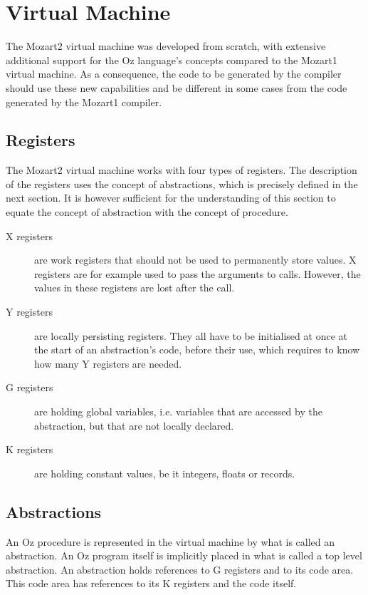 \documentclass[a4paper]{memoir}
\begin{document}
\section{Virtual Machine}
The Mozart2 virtual machine was developed from scratch, with extensive additional support for the Oz language's concepts compared to the Mozart1 virtual machine. As a consequence, the code to be generated by the compiler should use these new capabilities and be different in some cases from the code generated by the Mozart1 compiler.


\subsection{Registers}\label{sec:intro:registers}
The Mozart2 virtual machine works with four types of registers. The description of the registers uses the concept of abstractions, which is precisely defined in the next section. It is however sufficient for the understanding of this section to equate the concept of abstraction with the concept of procedure.
\begin{description}
  \item[X registers]are work registers that should not be used to permanently
    store values. X registers are for example used to pass the arguments to calls. However, the values in these registers are lost after the call. %
  \item[Y registers]are locally persisting registers. They all have to be initialised at once at the start of an abstraction's code, before their use, which requires to know how many Y registers are needed.
  \item[G registers] are holding global variables, i.e. variables that are accessed by the abstraction, but that are not locally declared.
  \item[K registers] are holding constant values, be it integers, floats or records.
\end{description}

\subsection{Abstractions}\label{sec:vm:abstractions}
An Oz procedure is represented in the virtual machine by what is called an abstraction. An Oz program itself is implicitly placed in what is called a top level abstraction.
An abstraction holds references to G registers and to its code area. This code area has references to its K registers and the code itself. 
\end{document}
